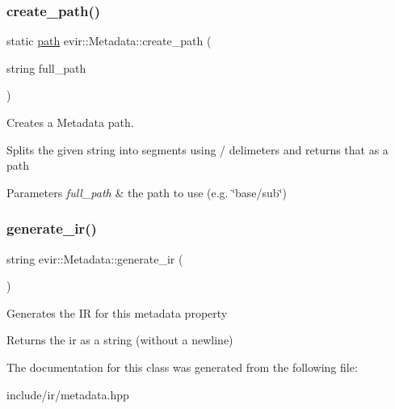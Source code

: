 \subsubsection{\texorpdfstring{create\+\_\+path()}{create\_path()}}
{\footnotesize\ttfamily static \hyperlink{classevir_1_1Metadata_a0a3a8f0c937238fae5262283bac6286a}{path} evir\+::\+Metadata\+::create\+\_\+path (\begin{DoxyParamCaption}\item[{string}]{full\+\_\+path }\end{DoxyParamCaption})\hspace{0.3cm}{\ttfamily [static]}}



Creates a Metadata path. 

Splits the given string into segments using {\ttfamily /} delimeters and returns that as a path 
\begin{DoxyParams}{Parameters}
{\em full\+\_\+path} & the path to use (e.\+g. \char`\"{}base/sub\char`\"{}) \\
\hline
\end{DoxyParams}
\mbox{\label{classevir_1_1Metadata_a4fe174d10ee934c0eb531f38bbb8b4df}} 
\subsubsection{\texorpdfstring{generate\+\_\+ir()}{generate\_ir()}}
{\footnotesize\ttfamily string evir\+::\+Metadata\+::generate\+\_\+ir (\begin{DoxyParamCaption}{ }\end{DoxyParamCaption})}

Generates the IR for this metadata property \begin{DoxyReturn}{Returns}
the ir as a string (without a newline) 
\end{DoxyReturn}


The documentation for this class was generated from the following file\+:\begin{DoxyCompactItemize}
\item 
include/ir/metadata.\+hpp\end{DoxyCompactItemize}
